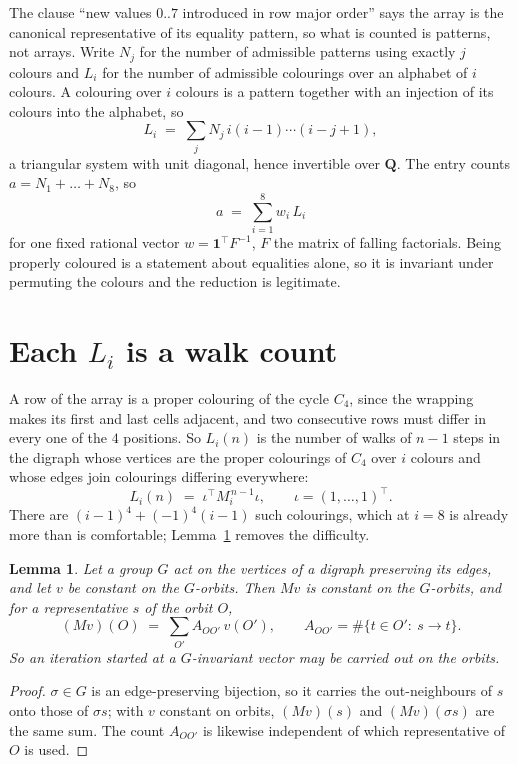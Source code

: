 \documentclass[11pt,a4paper]{article}
\theoremstyle{plain}
\newtheorem{lemma}[theorem]{Lemma}
\theoremstyle{definition}
\begin{document}
The clause ``new values $0..7$ introduced in row major order'' says the array is the
canonical representative of its equality pattern, so what is counted is patterns, not arrays.
Write $N_j$ for the number of admissible patterns using exactly $j$ colours and $L_i$ for the
number of admissible colourings over an alphabet of $i$ colours. A colouring over $i$ colours
is a pattern together with an injection of its colours into the alphabet, so
\[
L_i\;=\;\sum_j N_j\,i(i-1)\cdots(i-j+1),
\]
a triangular system with unit diagonal, hence invertible over $\mathbf{Q}$. The entry counts
$a=N_1+\dots+N_{8}$, so
\[
a\;=\;\sum_{i=1}^{8}w_i\,L_i
\]
for one fixed rational vector $w=\mathbf{1}^{\!\top}F^{-1}$, $F$ the matrix of falling
factorials. Being properly coloured is a statement about equalities alone, so it is invariant
under permuting the colours and the reduction is legitimate.

\section{Each $L_i$ is a walk count}

A row of the array is a proper colouring of the cycle $C_{4}$, since the wrapping makes
its first and last cells adjacent, and two consecutive rows must differ in every one of the
$4$ positions. So $L_i(n)$ is the number of walks of $n-1$ steps in the digraph whose
vertices are the proper colourings of $C_{4}$ over $i$ colours and whose edges join
colourings differing everywhere:
\[
L_i(n)\;=\;\iota^{\!\top}M_i^{\,n-1}\iota ,\qquad \iota=(1,\dots,1)^{\!\top} .
\]
There are $(i-1)^{4}+(-1)^{4}(i-1)$ such colourings, which at $i=8$ is already more
than is comfortable; Lemma~\ref{lem:lump} removes the difficulty.

\begin{lemma}\label{lem:lump}
Let a group $G$ act on the vertices of a digraph preserving its edges, and let $v$ be constant
on the $G$-orbits. Then $Mv$ is constant on the $G$-orbits, and for a representative $s$ of
the orbit $O$,
\[
(Mv)(O)\;=\;\sum_{O'}A_{OO'}\,v(O'),\qquad
A_{OO'}=\#\{t\in O':\ s\to t\} .
\]
So an iteration started at a $G$-invariant vector may be carried out on the orbits.
\end{lemma}

\begin{proof}
$\sigma\in G$ is an edge-preserving bijection, so it carries the out-neighbours of $s$ onto
those of $\sigma s$; with $v$ constant on orbits, $(Mv)(s)$ and $(Mv)(\sigma s)$ are the same
sum. The count $A_{OO'}$ is likewise independent of which representative of $O$ is used.
\end{proof}
\end{document}
